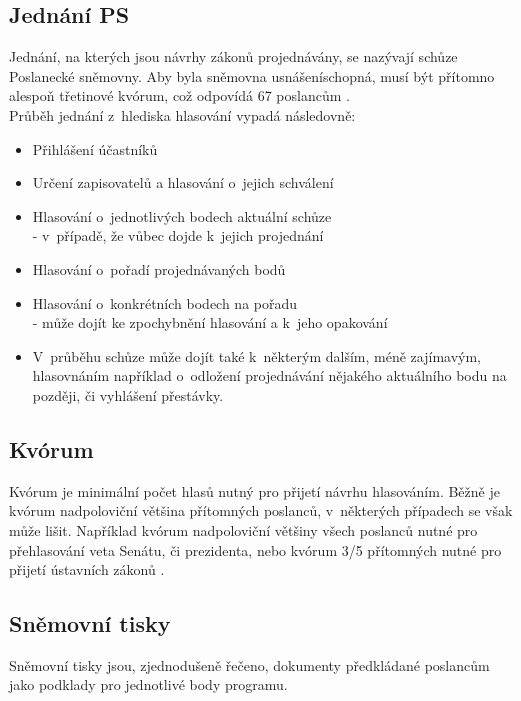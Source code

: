 \subsection{Jednání PS}
\par Jednání, na kterých jsou návrhy zákonů projednávány, se nazývají schůze Poslanecké sněmovny. Aby byla sněmovna usnášeníschopná, musí být přítomno alespoň třetinové kvórum, což odpovídá 67 poslancům \cite{ustava-kvorum}. \\
Průběh jednání z~hlediska hlasování vypadá následovně:
\begin{itemize}
    \item Přihlášení účastníků
    \item Určení zapisovatelů a hlasování o~jejich schválení
    \item Hlasování o~jednotlivých bodech aktuální schůze \\
    - v~případě, že vůbec dojde k~jejich projednání
    \item Hlasování o~pořadí projednávaných bodů
    \item Hlasování o~konkrétních bodech na pořadu\\
    - může dojít ke zpochybnění hlasování a k~jeho opakování
    \item V~průběhu schůze může dojít také k~některým dalším, méně zajímavým, hlasovnáním například o~odložení projednávání nějakého aktuálního bodu na později, či vyhlášení přestávky.
    
\end{itemize}

\subsection{Kvórum}
Kvórum je minimální počet hlasů nutný pro přijetí návrhu hlasováním. Běžně je kvórum nadpoloviční většina přítomných poslanců, v~některých případech se však může lišit. Například kvórum nadpoloviční většiny všech poslanců nutné pro přehlasování veta Senátu, či prezidenta, nebo kvórum 3/5 přítomných nutné pro přijetí ústavních zákonů \cite{zakon-kvorum}.

\subsection{Sněmovní tisky}
Sněmovní tisky jsou, zjednodušeně řečeno, dokumenty předkládané poslancům jako podklady pro jednotlivé body programu. 

